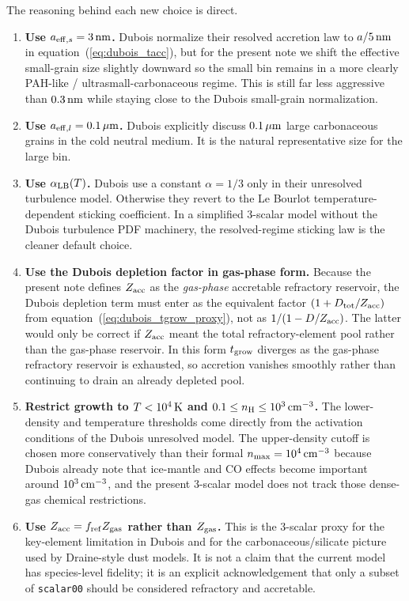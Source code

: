 \documentclass[11pt]{article}
\begin{document}
The reasoning behind each new choice is direct.
\begin{enumerate}
\item \textbf{Use $a_{{\rm eff},s}=3\,{\rm nm}$.} Dubois normalize their resolved accretion law to $a/5\,{\rm nm}$ in equation~(\ref{eq:dubois_tacc}), but for the present note we shift the effective small-grain size slightly downward so the small bin remains in a more clearly PAH-like / ultrasmall-carbonaceous regime. This is still far less aggressive than $0.3\,{\rm nm}$ while staying close to the Dubois small-grain normalization.
\item \textbf{Use $a_{{\rm eff},l}=0.1\,\mu{\rm m}$.} Dubois explicitly discuss $0.1\,\mu{\rm m}$ large carbonaceous grains in the cold neutral medium. It is the natural representative size for the large bin.
\item \textbf{Use $\alpha_{\rm LB}(T)$.} Dubois use a constant $\alpha=1/3$ only in their unresolved turbulence model. Otherwise they revert to the Le Bourlot temperature-dependent sticking coefficient. In a simplified 3-scalar model without the Dubois turbulence PDF machinery, the resolved-regime sticking law is the cleaner default choice.
\item \textbf{Use the Dubois depletion factor in gas-phase form.} Because the present note defines $Z_{\rm acc}$ as the \emph{gas-phase} accretable refractory reservoir, the Dubois depletion term must enter as the equivalent factor $(1+D_{\rm tot}/Z_{\rm acc})$ from equation~(\ref{eq:dubois_tgrow_proxy}), not as $1/(1-D/Z_{\rm acc})$. The latter would only be correct if $Z_{\rm acc}$ meant the total refractory-element pool rather than the gas-phase reservoir. In this form $t_{\rm grow}$ diverges as the gas-phase refractory reservoir is exhausted, so accretion vanishes smoothly rather than continuing to drain an already depleted pool.
\item \textbf{Restrict growth to $T<10^4\,{\rm K}$ and $0.1\le n_{\rm H}\le10^3\,{\rm cm^{-3}}$.} The lower-density and temperature thresholds come directly from the activation conditions of the Dubois unresolved model. The upper-density cutoff is chosen more conservatively than their formal $n_{\max}=10^4\,{\rm cm^{-3}}$ because Dubois already note that ice-mantle and CO effects become important around $10^3\,{\rm cm^{-3}}$, and the present 3-scalar model does not track those dense-gas chemical restrictions.
\item \textbf{Use $Z_{\rm acc}=f_{\rm ref}Z_{\rm gas}$ rather than $Z_{\rm gas}$.} This is the 3-scalar proxy for the key-element limitation in Dubois and for the carbonaceous/silicate picture used by Draine-style dust models. It is not a claim that the current model has species-level fidelity; it is an explicit acknowledgement that only a subset of \texttt{scalar00} should be considered refractory and accretable.
\end{enumerate}
\end{document}
